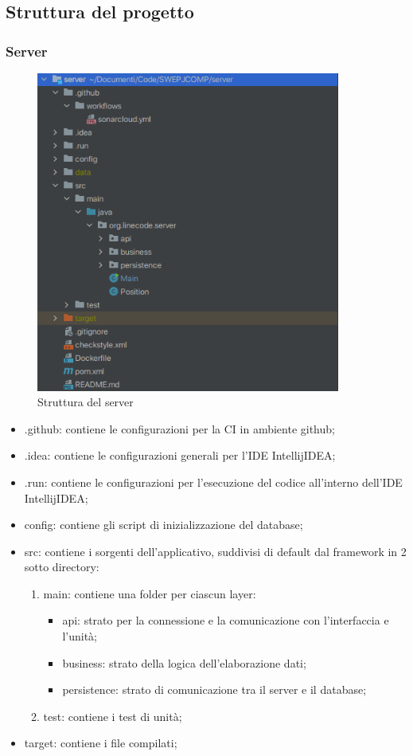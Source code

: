 \subsection{Struttura del progetto}
	\subsubsection{Server}
	
	\begin{figure}[H]
		\centering
		\includegraphics[width=10cm]{img/struttura_server.png}
		\caption{Struttura del server}
	\end{figure}

	\begin{itemize}
		\item{.github}: contiene le configurazioni per la CI in ambiente github;
		\item{.idea}: contiene le configurazioni generali per l'IDE IntellijIDEA;
		\item{.run}: contiene le configurazioni per l'esecuzione del codice all'interno	dell'IDE IntellijIDEA;
		\item{config}: contiene gli script di inizializzazione del database;
		\item{src}: contiene i sorgenti dell'applicativo, suddivisi di default dal framework in 2 sotto	directory:
		\begin{enumerate}
			\item{main}: contiene una folder per ciascun layer:
				\begin{itemize}
					\item{api}: strato per la connessione e la comunicazione con l'interfaccia e l'unità;
					\item{business}: strato della logica dell'elaborazione dati;
					\item{persistence}: strato di comunicazione tra il server e il database;
				\end{itemize}
			\item{test}: contiene i test di unità;
		\end{enumerate}
		\item{target}: contiene i file compilati;
	\end{itemize}

